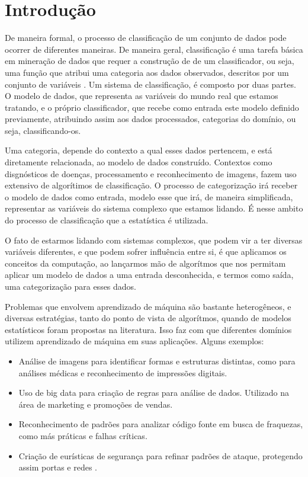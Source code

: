 \chapter*[Introdução]{Introdução}

De maneira formal, o processo de classificação de um conjunto de dados pode ocorrer de diferentes maneiras. De maneira geral, classificação é uma tarefa básica em mineração de dados que requer a construção de de um classificador, ou seja, uma função que atribui uma categoria aos dados observados, descritos por um conjunto de variáveis \cite{Taheri}. Um sistema de classificação, é composto por duas partes. O modelo de dados, que representa as variáveis do mundo real que estamos tratando, e o próprio classificador, que recebe como entrada este modelo definido previamente, atribuindo assim aos dados processados, categorias do domínio, ou seja, classificando-os.

 Uma categoria, depende do contexto a qual esses dados pertencem, e está diretamente relacionada, ao modelo de dados construído. Contextos como disgnósticos de doenças, processamento e reconhecimento de imagens, fazem uso extensivo de algorítimos de classificação. O processo de categorização irá receber o modelo de dados como entrada, modelo esse que irá, de maneira simplificada, representar as variáveis do sistema complexo que estamos lidando. É nesse ambito do processo de classificação que a estatística é utilizada.

 O fato de estarmos lidando com sistemas complexos, que podem vir a ter diversas variáveis diferentes, e que podem sofrer influência entre si, é que aplicamos os conceitos da computação, ao lançarmos mão de algorítmos que nos permitam aplicar um modelo de dados a uma entrada desconhecida, e termos como saída, uma categorização para esses dados.

Problemas que envolvem aprendizado de máquina são bastante heterogêneos, e diversas estratégias, tanto do ponto de vista de algorítmos, quando de modelos estatísticos foram propostas na literatura. Isso faz com que diferentes domínios utilizem aprendizado de máquina
em suas aplicações. Alguns exemplos:

\begin{itemize}
\item Análise de imagens para identificar formas e estruturas distintas, como para análises médicas e reconhecimento de impressões digitais\cite{Louridas}.

\item Uso de big data para criação de regras para análise de dados. Utilizado na área de marketing e promoções de vendas\cite{Louridas}.

\item Reconhecimento de padrões para analizar código fonte em busca de fraquezas, como más práticas e falhas críticas\cite{Louridas}.

\item Criação de eurísticas de segurança para refinar padrões de ataque, protegendo assim portas e redes \cite{Louridas}.
\end{itemize}


